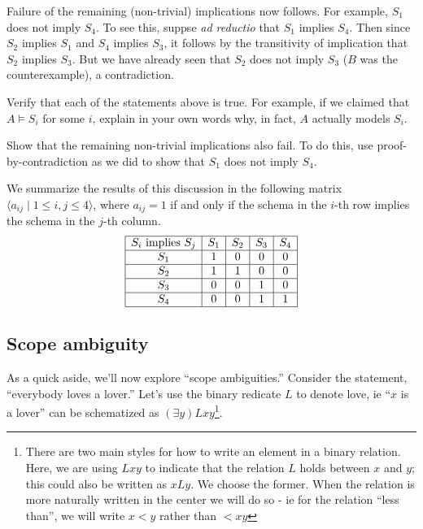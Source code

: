 Failure of the remaining (non-trivial) implications now follows. For example, $S_1$ does not imply $S_4$. To see this, suppse \emph{ad reductio} that $S_1$ implies $S_4$. Then since $S_2$ implies $S_1$ and $S_4$ implies $S_3$, it follows by the transitivity of implication that $S_2$ implies $S_3$. But we have already seen that $S_2$ does not imply $S_3$ ($B$ was the counterexample), a contradiction.

\begin{aside}
    Verify that each of the statements above is true. For example, if we claimed that $A \models S_i$ for some $i$, explain in your own words why, in fact, $A$ actually models $S_i$.  

    Show that the remaining non-trivial implications also fail. To do this, use proof-by-contradiction as we did to show that $S_1$ does not imply $S_4$. 
\end{aside}

We summarize the results of this discussion in the following matrix $\langle a_{ij}\mid 1\leq i,j\leq 4\rangle$, where $a_{ij} = 1$ if and only if the schema in the $i$-th row implies the schema in the $j$-th column.
\[
\begin{array}{| c | c | c | c | c|}
\hline
 S_i\mbox{ implies }S_j& S_1 & S_2 & S_3 & S_4\\
  \hline            
  S_1 & 1 & 0 & 0 & 0\\
  \hline
  S_2  & 1 & 1 & 0 & 0\\
 \hline
 S_3 & 0 & 0 & 1 & 0\\
 \hline
 S_4 & 0 & 0 & 1 & 1\\
 \hline  
\end{array}
\]


\subsection*{Scope ambiguity}
As a quick aside, we'll now explore ``scope ambiguities.'' Consider the statement, ``everybody loves a lover.'' Let's use the binary redicate $L$ to denote love, ie ``$x$ is a lover'' can be schematized as $(\exists y)Lxy$\footnote{There are two main styles for how to write an element in a binary relation. Here, we are using $Lxy$ to indicate that the relation $L$ holds between $x$ and $y$; this could also be written as $xLy$. We choose the former. When the relation is more naturally written in the center we will do so - ie for the relation ``less than'', we will write $x < y$ rather than $<xy$}. 


